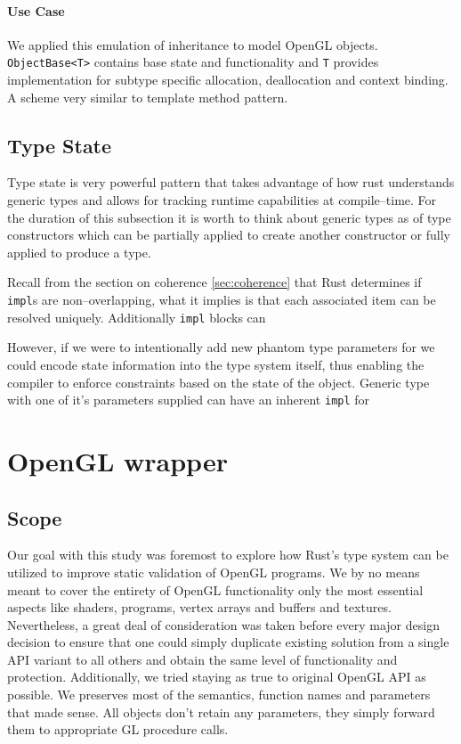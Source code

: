 \paragraph{Use Case}

We applied this emulation of inheritance to model OpenGL objects. \texttt{ObjectBase<T>} contains base state and functionality and \texttt{T} provides implementation for subtype specific allocation, deallocation and context binding.
A scheme very similar to template method pattern.

\subsection{Type State}

Type state is very powerful pattern that takes advantage of how rust understands generic types and allows for tracking runtime capabilities at compile--time.
For the duration of this subsection it is worth to think about generic types as of type constructors which can be partially applied to create another constructor or fully applied to produce a type.

Recall from the section on coherence \ref{sec:coherence} that Rust determines if \texttt{impl}s are non--overlapping, what it implies is that each associated item can be resolved uniquely.
Additionally \texttt{impl} blocks can 



However, if we were to intentionally add new phantom type parameters 
for 
we could encode state information into the type system itself, thus enabling the compiler to enforce constraints based on the state of the object.
Generic type with one of it's parameters supplied can have an inherent \texttt{impl} for 

\section{OpenGL wrapper}
  
\subsection*{Scope}

Our goal with this study was foremost to explore how Rust's type system can be utilized to improve static validation of OpenGL programs.
We by no means meant to cover the entirety of OpenGL functionality only the most essential aspects like shaders, programs, vertex arrays and buffers and textures.
Nevertheless, a great deal of consideration was taken before every major design decision to ensure that one could simply duplicate existing solution from a single 
API variant to all others and obtain the same level of functionality and protection.
Additionally, we tried staying as true to original OpenGL API as possible. We preserves most of the semantics, function names and parameters that made sense.
All objects don't retain any parameters, they simply forward them to appropriate GL procedure calls. 

